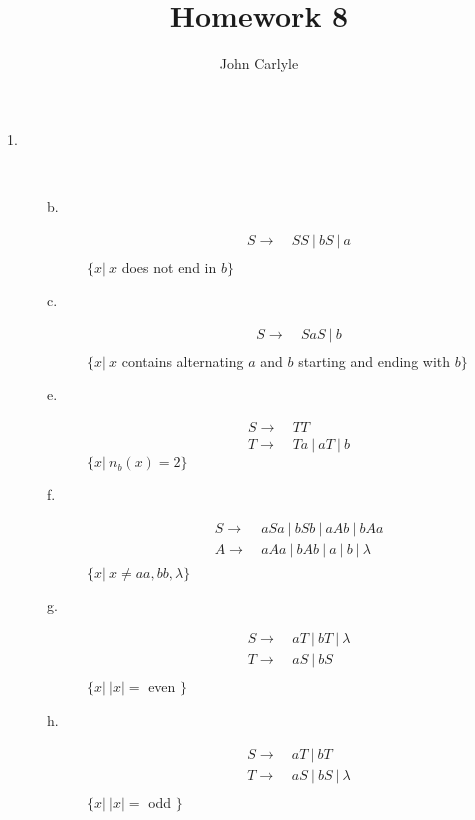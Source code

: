 \documentclass{article}
\title{Homework 8}
\author{John Carlyle}
\begin{document}
\maketitle

\begin{description}
  
\item[1.]\hfill \\
  \begin{description}
  \item[b.]
    \begin{align*}
      S \rightarrow&\: SS ~|~ bS ~|~ a\\
    \end{align*}
    $\{ x | ~x$ does not end in $b\}$
    
  \item[c.]
    \begin{align*}
      S \rightarrow&\: SaS ~|~ b\\
    \end{align*}
    $\{ x |~ x$ contains alternating $a$ and $b$ starting and ending with $b\}$
    
  \item[e.]
    \begin{align*}
      S \rightarrow& \: TT\\
      T \rightarrow& \: Ta ~|~ aT ~|~ b
    \end{align*}
    $\{x|~n_b(x) = 2\}$

  \item[f.]
    \begin{align*}
      S \rightarrow& \: aSa ~|~ bSb ~|~ aAb ~|~ bAa\\
      A \rightarrow& \: aAa ~|~ bAb ~|~ a ~|~ b ~|~ \lambda\\
    \end{align*}
    $\{ x | ~ x \ne aa, bb, \lambda \}$

  \item[g.]
    \begin{align*}
      S \rightarrow&~ aT ~|~ bT ~|~ \lambda\\
      T \rightarrow&~ aS ~|~ bS\\
    \end{align*}
    $\{x |~|x| = $ even $\}$

  \item[h.]
    \begin{align*}
      S \rightarrow&~ aT ~|~ bT\\
      T \rightarrow& \: aS ~|~ bS ~|~ \lambda\\
    \end{align*}
    $\{ x |~|x| = $ odd $ \} $


\end{description}
\end{description}
\end{document}
